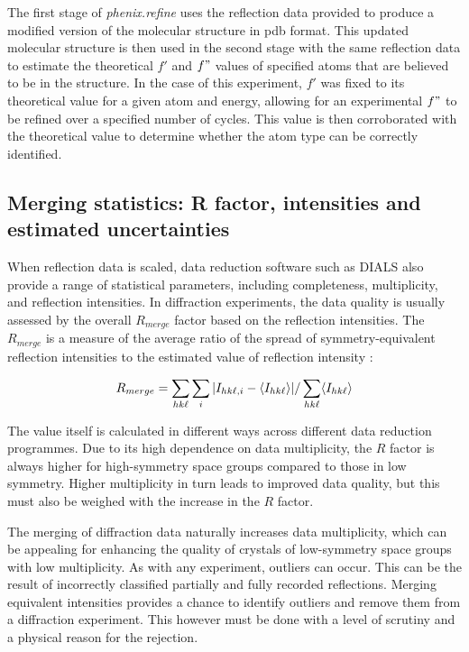 The first stage of \textit{phenix.refine} uses the reflection data provided to produce a modified version of the molecular structure in \ac{pdb} format. This updated molecular structure is then used in the second stage with the same reflection data to estimate the theoretical $f'$ and $f"$ values of specified atoms that are believed to be in the structure. In the case of this experiment, $f'$ was fixed to its theoretical value for a given atom and energy, allowing for an experimental $f"$ to be refined over a specified number of cycles. This value is then corroborated with the theoretical value to determine whether the atom type can be correctly identified.%

\subsection{Merging statistics: R factor, intensities and estimated uncertainties}

When reflection data is scaled, data reduction software such as DIALS also provide a range of statistical parameters, including completeness, multiplicity, and reflection intensities. In diffraction experiments, the data quality is usually assessed by the overall $R_{merge}$ factor based on the reflection intensities. The $R_{merge}$ is a measure of the average ratio of the spread of symmetry-equivalent reflection intensities to the estimated value of reflection intensity \cite{Dauter1999}:

\begin{equation}
    R_{merge} = \sum_{hk\ell}\sum_i | I_{hk\ell,i} - \langle I_{hk\ell} \rangle | / \sum_{hk\ell} \langle I_{hk\ell} \rangle
\end{equation}

The value itself is calculated in different ways across different data reduction programmes. Due to its high dependence on data multiplicity, the $R$ factor is always higher for high-symmetry space groups compared to those in low symmetry. Higher multiplicity in turn leads to improved data quality, but this must also be weighed with the increase in the $R$ factor.

The merging of diffraction data naturally increases data multiplicity, which can be appealing for enhancing the quality of crystals of low-symmetry space groups with low multiplicity. As with any experiment, outliers can occur. This can be the result of incorrectly classified partially and fully recorded reflections. Merging equivalent intensities provides a chance to identify outliers and remove them from a diffraction experiment. This however must be done with a level of scrutiny and a physical reason for the rejection.

